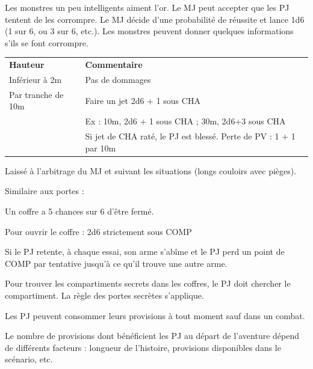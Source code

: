 \begin{frame}[b]
{\begin{minipage}[c][0.95\textheight][c]{\linewidth}

Les monstres un peu intelligents aiment l'or. Le MJ peut accepter que les PJ tentent de les corrompre. Le MJ décide d'une probabilité de réussite et lance 1d6 (1 sur 6, ou 3 sur 6, etc.). Les monstres peuvent donner quelques informations s'ils se font corrompre.


\vspace{0.2cm}

\begin{tabular}{lp{5.8cm}}
\textbf{Hauteur} & \textbf{Commentaire} \\
Inférieur à 2m     & Pas de dommages                                                   \\
Par tranche de 10m & Faire un jet 2d6 + 1 sous CHA                                     \\
                   & Ex : 10m, 2d6 + 1 sous CHA ; 30m, 2d6+3 sous CHA                  \\
                   & Si jet de CHA raté, le PJ est blessé. Perte de PV : 1 + 1 par 10m \\
\end{tabular}

\vspace{0.2cm}


Laissé à l'arbitrage du MJ et suivant les situations (longs couloirs avec pièges).


Similaire aux portes :
\begin{myitemize}
\item Un coffre a 5 chances sur 6 d'être fermé.
\item Pour ouvrir le coffre : 2d6 strictement sous COMP
\item Si le PJ retente, à chaque essai, son arme s'abîme et le PJ perd un point de COMP par tentative jusqu'à ce qu'il trouve une autre arme.
\end{myitemize}

Pour trouver les compartiments secrets dans les coffres, le PJ doit chercher le compartiment. La règle des portes secrètes s'applique.


Les PJ peuvent consommer leurs provisions à tout moment sauf dans un combat.

Le nombre de provisions dont bénéficient les PJ au départ de l'aventure dépend de différents facteurs : longueur de l'histoire, provisions disponibles dans le scénario, etc.


\end{minipage}}
\end{frame}

